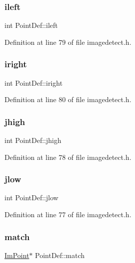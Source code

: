 \subsubsection{\texorpdfstring{ileft}{ileft}}
{\footnotesize\ttfamily int Point\+Def\+::ileft}



Definition at line 79 of file imagedetect.\+h.

\mbox{\label{struct_point_def_a2c7e8235ddfc4893192cc9cc555df4dc}} 
\subsubsection{\texorpdfstring{iright}{iright}}
{\footnotesize\ttfamily int Point\+Def\+::iright}



Definition at line 80 of file imagedetect.\+h.

\mbox{\label{struct_point_def_a45479f24a2ba580ca93b59772885b6eb}} 
\subsubsection{\texorpdfstring{jhigh}{jhigh}}
{\footnotesize\ttfamily int Point\+Def\+::jhigh}



Definition at line 78 of file imagedetect.\+h.

\mbox{\label{struct_point_def_a8e8906fb29744653229c1432d0783b71}} 
\subsubsection{\texorpdfstring{jlow}{jlow}}
{\footnotesize\ttfamily int Point\+Def\+::jlow}



Definition at line 77 of file imagedetect.\+h.

\mbox{\label{struct_point_def_a038293d4526cf9fbc6dbde3d27e2d115}} 
\subsubsection{\texorpdfstring{match}{match}}
{\footnotesize\ttfamily \mbox{\hyperlink{struct_im_point}{Im\+Point}}$\ast$ Point\+Def\+::match}



